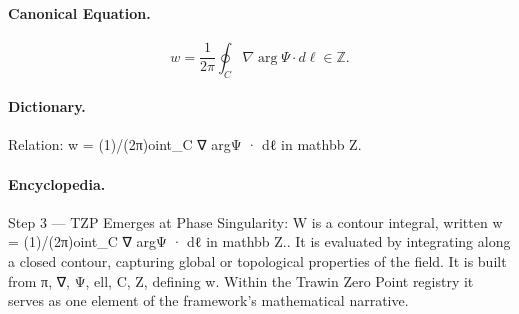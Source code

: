 \paragraph{Canonical Equation.}
\[
w = \frac{1}{2\pi}\oint_C \nabla \arg\Psi \cdot d\ell \in \mathbb Z.
\]

\paragraph{Dictionary.}
Relation: w = (1)/(2π)oint\_C ∇ argΨ · dℓ in mathbb Z.

\paragraph{Encyclopedia.}
Step 3 — TZP Emerges at Phase Singularity: W is a contour integral, written w = (1)/(2π)oint\_C ∇ argΨ · dℓ in mathbb Z.. It is evaluated by integrating along a closed contour, capturing global or topological properties of the field. It is built from π, ∇, Ψ, ell, C, Z, defining w. Within the Trawin Zero Point registry it serves as one element of the framework's mathematical narrative.
